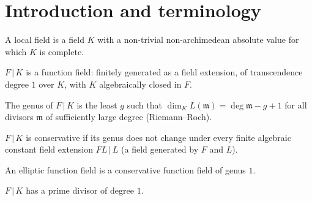 
\section{Introduction and terminology}

\begin{definition}
\label{def:local-field}
\leanok
A local field is a field $K$ with a non-trivial non-archimedean absolute value for which $K$ is complete.
\end{definition}

\begin{definition}
\label{def:function-field}
\leanok
$F\,|\,K$ is a function field: finitely generated as a field extension, of transcendence degree $1$ over $K$, with $K$ algebraically closed in $F$.
\end{definition}

\begin{definition}[Genus]
\label{def:genus}
\leanok
The genus of $F\,|\,K$ is the least $g$ such that $\dim_K L(\mathfrak m)=\deg\mathfrak m-g+1$ for all divisors $\mathfrak m$ of sufficiently large degree (Riemann--Roch).
\end{definition}

\begin{definition}[Conservative]
\label{def:conservative}
\leanok
$F\,|\,K$ is conservative if its genus does not change under every finite algebraic constant field extension $FL\,|\,L$ (a field generated by $F$ and $L$).
\end{definition}

\begin{definition}
\label{def:elliptic}
\leanok
An elliptic function field is a conservative function field of genus $1$.
\end{definition}

\begin{definition}
\label{def:degree-one-prime}
\leanok
$F\,|\,K$ has a prime divisor of degree $1$.
\end{definition}

